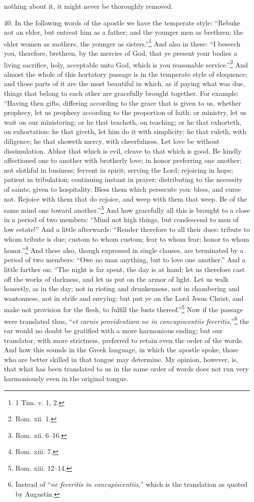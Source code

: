 nothing about it, it might never be thoroughly removed.

40. In the following words of the apostle we have the temperate style: “Rebuke not an elder, but entreat him as a father; and the younger men as brethren; the elder women as mothers, the younger as sisters.”\footnote{1 Tim. v. 1, 2.} And also in these: “I beseech you, therefore, brethren, by the mercies of God, that ye present your bodies a living sacrifice, holy, acceptable unto God, which is you reasonable service.”\footnote{Rom. xii. 1.} And almost the whole of this hortatory passage is in the temperate style of eloquence; and those parts of it are the most beautiful in which, as if paying what was due, things that belong to each other are gracefully brought together. For example: “Having then gifts, differing according to the grace that is given to us, whether prophecy, let us prophesy according to the proportion of faith; or ministry, let us wait on our ministering; or he that teacheth, on teaching; or he that exhorteth, on exhortation: he that giveth, let him do it with simplicity; he that ruleth, with diligence; he that showeth mercy, with cheerfulness. Let love be without dissimulation. Abhor that which is evil, cleave to that which is good. Be kindly affectioned one to another with brotherly love; in honor preferring one another; not slothful in business; fervent in spirit; serving the Lord; rejoicing in hope; patient in tribulation; continuing instant in prayer; distributing to the necessity of saints; given to hospitality. Bless them which persecute you: bless, and curse not. Rejoice with them that do rejoice, and weep with them that weep. Be of the same mind one toward another.”\footnote{Rom. xii. 6–16.} And how gracefully all this is brought to a close in a period of two members: “Mind not high things, but condescend to men of low estate!” And a little afterwards: “Render therefore to all their dues: tribute to whom tribute is due; custom to whom custom; fear to whom fear; honor to whom honor.”\footnote{Rom. xiii. 7.} And these also, though expressed in single clauses, are terminated by a period of two members: “Owe no man anything, but to love one another.” And a little farther on: “The night is far spent, the day is at hand: let us therefore cast off the works of darkness, and let us put on the armor of light. Let us walk honestly, as in the day; not in rioting and drunkenness, not in chambering and wantonness, not in strife and envying: but put ye on the Lord Jesus Christ, and make not provision for the flesh, to fulfill the lusts thereof.”\footnote{Rom. xiii. 12–14.} Now if the passage were translated thus, “\emph{et carnis providentiam ne in concupiscentiis feceritis},”\footnote{Instead of “\emph{ne feceritis in concupiscentiis},” which is the translation as quoted by Augustin.} the ear would no doubt be gratified with a more harmonious ending; but our translator, with more strictness, preferred to retain even the order of the words. And how this sounds in the Greek language, in which the apostle spoke, those who are better skilled in that tongue may determine. My opinion, however, is, that what has been translated to us in the same order of words does not run very harmoniously even in the original tongue.

